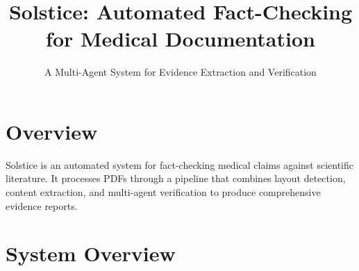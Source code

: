 \documentclass[11pt]{article}
\title{\textbf{Solstice: Automated Fact-Checking for Medical Documentation}}
\author{A Multi-Agent System for Evidence Extraction and Verification}
\date{}
\begin{document}
\maketitle

\section{Overview}

Solstice is an automated system for fact-checking medical claims against scientific literature. It processes PDFs through a pipeline that combines layout detection, content extraction, and multi-agent verification to produce comprehensive evidence reports.

\section{System Overview}
\end{document}

